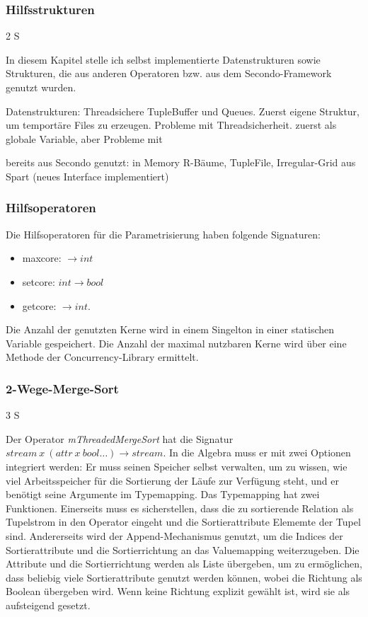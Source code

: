 \documentclass[a4paper,12pt,twoside]{article}
\newcommand{\Fb}[1]{\textit{#1}} %
\begin{document}
\subsubsection{Hilfsstrukturen} 2 S
\label{Hilfsstrukturen} 

In diesem Kapitel stelle ich  selbst implementierte Datenstrukturen sowie Strukturen, die aus anderen Operatoren bzw. aus dem Secondo-Framework genutzt wurden.


Datenstrukturen:
Threadsichere TupleBuffer und Queues. Zuerst eigene Struktur, um temportäre Files zu erzeugen. Probleme mit Threadsicherheit. zuerst als globale Variable, aber Probleme mit 

bereits aus Secondo genutzt: 
in Memory R-Bäume, TupleFile, Irregular-Grid aus Spart (neues Interface implementiert)


\subsubsection{Hilfsoperatoren}

Die Hilfsoperatoren für die Parametrisierung haben folgende Signaturen:

\begin{itemize}
	\item maxcore: $\longrightarrow int$
	\item setcore: $int \longrightarrow bool$
	\item getcore: $\longrightarrow int$.
\end{itemize}

Die Anzahl der genutzten Kerne wird in einem Singelton in einer statischen Variable gespeichert. Die Anzahl der maximal nutzbaren Kerne wird über eine Methode der Concurrency-Library ermittelt.

\subsubsection{2-Wege-Merge-Sort} 3 S

Der Operator \Fb{mThreadedMergeSort} hat die Signatur $stream~x~(attr~x~bool \ldots) \longrightarrow stream$. In die Algebra muss er mit zwei Optionen integriert werden: Er muss seinen Speicher selbst verwalten, um zu wissen, wie viel Arbeitsspeicher für die Sortierung der Läufe zur Verfügung steht, und er benötigt seine Argumente im Typemapping. Das Typemapping hat zwei Funktionen. Einerseits muss es sicherstellen, dass die zu sortierende Relation als Tupelstrom in den Operator eingeht und die Sortierattribute Elememte der Tupel sind. Andererseits wird der Append-Mechanismus genutzt, um die Indices der Sortierattribute und die Sortierrichtung an das Valuemapping weiterzugeben. Die Attribute und die Sortierrichtung werden als Liste übergeben, um zu ermöglichen, dass beliebig viele Sortierattribute genutzt werden können, wobei die Richtung als Boolean übergeben wird. Wenn keine Richtung explizit gewählt ist, wird sie als aufsteigend gesetzt.
\end{document}
